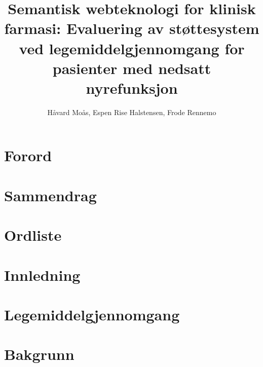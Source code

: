 \documentclass[12pt]{report}
\title{Semantisk webteknologi for klinisk farmasi: Evaluering av støttesystem ved legemiddelgjennomgang for pasienter med nedsatt nyrefunksjon}
\author{Håvard Moås, Espen Rise Halstensen, Frode Rennemo}
\begin{document}
\maketitle





\pagestyle{plain} 




\chapter*{Forord}

\chapter*{Sammendrag}

\newpage

\tableofcontents

\chapter*{Ordliste}




\printnoidxglossary[title=Forkortelser,type=\acronymtype]


\renewcommand{\listtablename}{Tabelliste}
\listoftables

\renewcommand{\listfigurename}{Figurliste}
\listoffigures


\chapter{Innledning}
\setcounter{page}{0}



\chapter{Legemiddelgjennomgang}



\chapter{Bakgrunn} %

\end{document}
